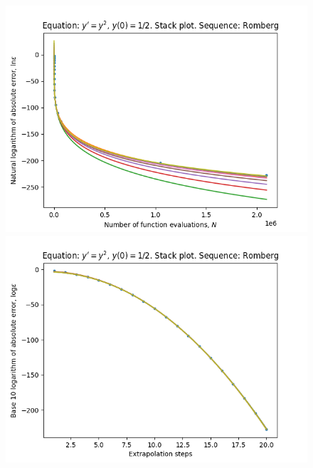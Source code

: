 \begin{figure}[H]
\centering
\begin{minipage}{0.45\textwidth}
\centering
\includegraphics[scale=0.45]{emr_plots/singularity_0_hp_romberg_stack.png}
\end{minipage}
\begin{minipage}{0.45\textwidth}
\centering
\includegraphics[scale=0.45]{emr_plots/singularity_0_hp_romberg_steps_stack.png}
\end{minipage}
\end{figure}

